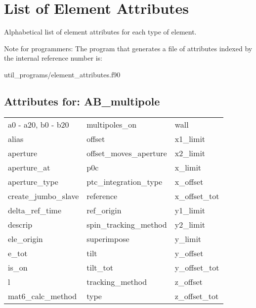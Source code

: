 \chapter{List of Element Attributes}
\label{c:attrib.list}

Alphabetical list of element attributes for each type of element. 

Note for programmers: The program that generates a file of attributes indexed by the
internal reference number is:
\begin{example}
  util_programs/element_attributes.f90 
\end{example}

 \section{Attributes for: AB_multipole}
 \label{s:list.ab.multipole}
 
 \begin{tabular}{lll} \toprule
a0 - a20, b0 - b20          & multipoles_on               & wall                        \\
alias                       & offset                      & x1_limit                    \\
aperture                    & offset_moves_aperture       & x2_limit                    \\
aperture_at                 & p0c                         & x_limit                     \\
aperture_type               & ptc_integration_type        & x_offset                    \\
create_jumbo_slave          & reference                   & x_offset_tot                \\
delta_ref_time              & ref_origin                  & y1_limit                    \\
descrip                     & spin_tracking_method        & y2_limit                    \\
ele_origin                  & superimpose                 & y_limit                     \\
e_tot                       & tilt                        & y_offset                    \\
is_on                       & tilt_tot                    & y_offset_tot                \\
l                           & tracking_method             & z_offset                    \\
mat6_calc_method            & type                        & z_offset_tot                \\
 \bottomrule
 \end{tabular}
 \vfill
 
